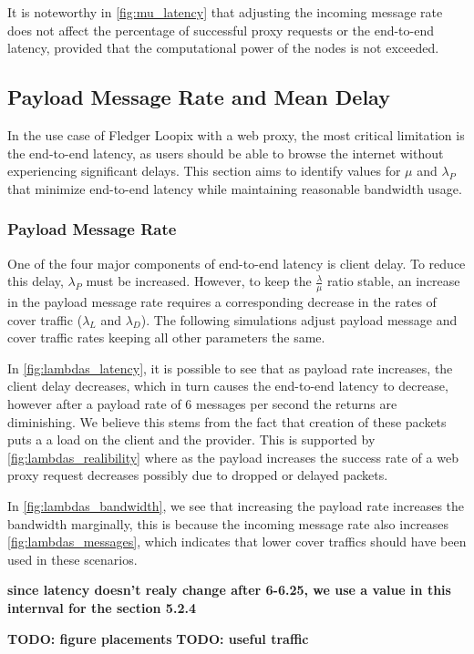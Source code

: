 \documentclass[a4paper,11pt,oneside]{report}
\begin{document}
It is noteworthy in \autoref{fig:mu_latency} that adjusting the incoming message rate does not affect the percentage of successful proxy requests or the end-to-end latency, provided that the computational power of the nodes is not exceeded.
\subsection{Payload Message Rate and Mean Delay}
In the use case of Fledger Loopix with a web proxy, the most critical limitation is the end-to-end latency, as users should be able to browse the internet without experiencing significant delays. This section aims to identify values for \(\mu\) and \(\lambda_P\) that minimize end-to-end latency while maintaining reasonable bandwidth usage.

\subsubsection{Payload Message Rate}
One of the four major components of end-to-end latency is client delay. To reduce this delay, \(\lambda_P\) must be increased. However, to keep the \(\frac{\lambda}{\mu}\) ratio stable, an increase in the payload message rate requires a corresponding decrease in the rates of cover traffic (\(\lambda_L\) and \(\lambda_D\)). The following simulations adjust payload message and cover traffic rates keeping all other parameters the same.

In \autoref{fig:lambdas_latency}, it is possible to see that as payload rate increases, the client delay decreases, which in turn causes the end-to-end latency to decrease, however after a payload rate of 6 messages per second the returns are diminishing. We believe this stems from the fact that creation of these packets puts a a load on the client and the provider. This is supported by \autoref{fig:lambdas_realibility} where as the payload increases the success rate of a web proxy request decreases possibly due to dropped or delayed packets.

In \autoref{fig:lambdas_bandwidth}, we see that increasing the payload rate increases the bandwidth marginally, this is because the incoming message rate also increases \autoref{fig:lambdas_messages}, which indicates that lower cover traffics should have been used in these scenarios.

\textbf{since latency doesn't realy change after 6-6.25, we use a value in this internval for the section 5.2.4}

\textbf{TODO: figure placements}
\textbf{TODO: useful traffic}
\end{document}
